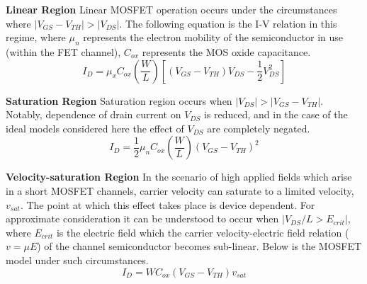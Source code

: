 
	\textbf{Linear Region}
	Linear MOSFET operation occurs under the circumstances where  $|V_{GS}-V_{TH}| > |V_{DS}|$. The following equation is the I-V relation in this regime, where $\mu_n$ represents the electron mobility of the semiconductor in use (within the FET channel), $C_{ox}$ represents the MOS oxide capacitance. 
	\begin{equation}
		I_D = \mu_x C_{ox} \left(\frac{W}{L}\right)\left[(V_{GS}-V_{TH})V_{DS}-\frac{1}{2}V_{DS}^2\right]
	\end{equation}

	\textbf{Saturation Region}
	Saturation region occurs when $|V_{DS}| > |V_{GS}-V_{TH}|$. Notably, dependence of drain current on $V_{DS}$ is reduced, and in the case of the ideal models considered here the effect of $V_{DS}$ are completely negated.
	\begin{equation}
		I_D = \frac{1}{2}\mu_n C_{ox} \left(\frac{W}{L}\right)(V_{GS}-V_{TH})^2
	\end{equation}


	\textbf{Velocity-saturation Region}
	In the scenario of high applied fields which arise in a short MOSFET channels, carrier velocity can saturate to a limited velocity, $v_{sat}$. The point at which this effect takes place is device dependent. For approximate consideration it can be understood to occur when $|V_{DS}/L > E_{crit}|$, where $E_{crit}$ is the electric field which the carrier velocity-electric field relation ($v = \mu E$) of the channel semiconductor becomes sub-linear. Below is the MOSFET model under such circumstances.
	\begin{equation}
		I_D = WC_{ox}(V_{GS}-V_{TH})v_{sat}
	\end{equation}

